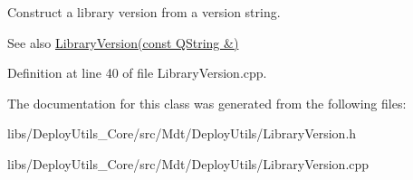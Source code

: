 Construct a library version from a version string. 

\begin{DoxySeeAlso}{See also}
\hyperlink{class_mdt_1_1_deploy_utils_1_1_library_version_a3e956306079849688ebf9889ec9ea192}{Library\+Version(const Q\+String \&)} 
\end{DoxySeeAlso}


Definition at line 40 of file Library\+Version.\+cpp.



The documentation for this class was generated from the following files\+:\begin{DoxyCompactItemize}
\item 
libs/\+Deploy\+Utils\+\_\+\+Core/src/\+Mdt/\+Deploy\+Utils/Library\+Version.\+h\item 
libs/\+Deploy\+Utils\+\_\+\+Core/src/\+Mdt/\+Deploy\+Utils/Library\+Version.\+cpp\end{DoxyCompactItemize}
